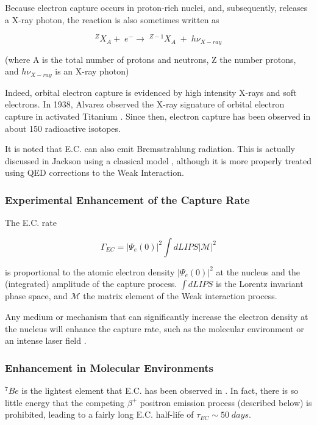 \documentclass[%
 aip,
 jmp,%
 amsmath,amssymb,
 reprint,%
]{revtex4-1}
\begin{document}
Because electron capture occurs in proton-rich nuclei, and, subsequently, releases a X-ray photon, the reaction is also sometimes written as

$$^{Z}X_{A}+\;e^{-}\rightarrow\;^{Z-1}X_{A}\;+\;h\nu_{X-ray}$$

(where A is the total number of protons and neutrons, Z the number protons, and $h\nu_{X-ray}$ is an X-ray photon)

Indeed, orbital electron capture is evidenced by high intensity X-rays and soft electrons.  In 1938, Alvarez observed the X-ray signature of orbital electron capture in activated Titanium \cite{alvarez}. Since then, electron capture has been observed in about 150 radioactive isotopes.

It is noted that E.C. can also emit Bremsstrahlung radiation.  This is actually discussed in Jackson using a classical model \cite{jackson}, although it is more properly treated using QED corrections to the Weak Interaction\cite{Jauch}.  

\subsubsection{Experimental Enhancement of the Capture Rate}

The E.C. rate 

$$\Gamma_{EC}=\big\vert\Psi_{e}(0)\big\vert^{2}\int dLIPS\big\vert\mathcal{M}\big\vert^{2}$$

is proportional to the atomic electron density  $\big\vert\Psi_{e}(0)\big\vert^{2}$  at the nucleus and the (integrated) amplitude of the capture process.
$\int dLIPS$ is the Lorentz invariant phase space,  and $\mathcal{M}$  the matrix element of the Weak interaction process.

Any medium or mechanism that can significantly increase the electron density at the nucleus will enhance the capture rate, such as the molecular environment \cite{ohtsuki} or an intense laser field \cite{sato}.

\subsubsection{Enhancement in Molecular Environments}

$^{7}Be$ is the  lightest element that E.C. has been observed in \cite{radbookbahcall}. In fact, there is so little energy that the competing $\beta^{+}$ positron emission process (described below) is prohibited, leading to a fairly long E.C. half-life of $\tau_{EC}\sim 50\;days$.
\end{document}
